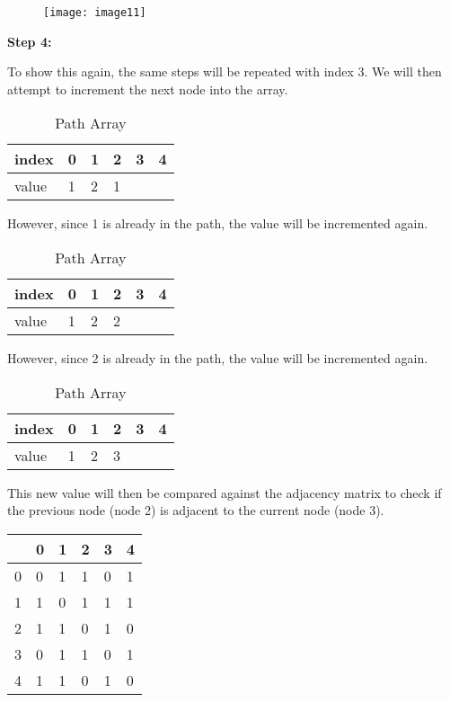 \begin{figure}[H]
    \centering
    \texttt{[image: image11]}
\end{figure}

\textbf{Step 4:}

To show this again, the same steps will be repeated with index 3.
We will then attempt to increment the next node into the array.

\begin{table}[H]
    \centering
    \caption{Path Array}
    \begin{tabular}{l | lllll}
        index & 0 & 1 & 2 & 3 & 4  \\
        \hline
        value & 1 & 2 & {\cellcolor[rgb]{0.933,0.804,0.804}}1 &   &    \\
    \end{tabular}
\end{table}

However, since 1 is already in the path, the value will be incremented again.

\begin{table}[H]
    \centering
    \caption{Path Array}
    \begin{tabular}{l | lllll}
        index & 0 & 1 & 2 & 3 & 4  \\
        \hline
        value & 1 & 2 & {\cellcolor[rgb]{0.933,0.804,0.804}}2 &   &    \\
    \end{tabular}
\end{table}

However, since 2 is already in the path, the value will be incremented again.

\begin{table}[H]
    \centering
    \caption{Path Array}
    \begin{tabular}{l | lllll}
        index & 0 & 1 & 2 & 3 & 4  \\
        \hline
        value & 1 & 2 & 3 &   &    \\
    \end{tabular}
\end{table}

This new value will then be compared against the adjacency matrix to check if
the previous node (node 2) is adjacent to the current node (node 3).

\begin{table}[H]
    \centering
    \begin{tabular}{l | lllll}
          & 0 & 1 & 2 & 3 & 4  \\
        \hline
        0 & 0 & 1 & 1 & 0 & 1  \\
        1 & 1 & 0 & 1 & 1 & 1  \\
        2 & 1 & {\cellcolor[rgb]{0.863,0.914,0.835}}1 & 0 & 1 & 0  \\
        3 & 0 & 1 & 1 & 0 & 1  \\
        4 & 1 & 1 & 0 & 1 & 0 
    \end{tabular}
\end{table}

